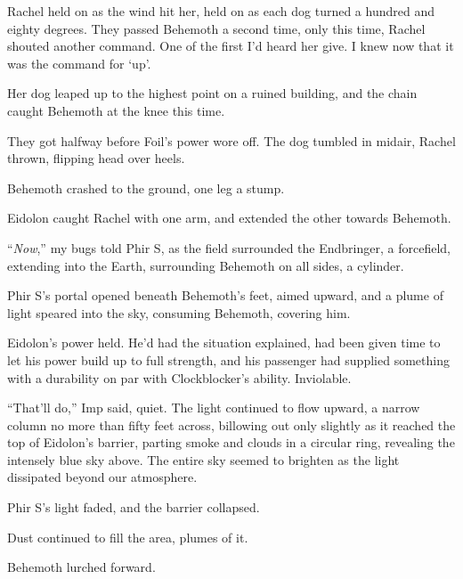 Rachel held on as the wind hit her, held on as each dog turned a hundred and eighty degrees.  They passed Behemoth a second time, only this time, Rachel shouted another command.  One of the first I'd heard her give.  I knew now that it was the command for `up'.



Her dog leaped up to the highest point on a ruined building, and the chain caught Behemoth at the knee this time.



They got halfway before Foil's power wore off.  The dog tumbled in midair, Rachel thrown, flipping head over heels.



Behemoth crashed to the ground, one leg a stump.



Eidolon caught Rachel with one arm, and extended the other towards Behemoth.



``\emph{Now},'' my bugs told Phir S, as the field surrounded the Endbringer, a forcefield, extending into the Earth, surrounding Behemoth on all sides, a cylinder.



Phir S's portal opened beneath Behemoth's feet, aimed upward, and a plume of light speared into the sky, consuming Behemoth, covering him.



Eidolon's power held.  He'd had the situation explained, had been given time to let his power build up to full strength, and his passenger had supplied something with a durability on par with Clockblocker's ability.  Inviolable.



``That'll do,'' Imp said, quiet.  The light continued to flow upward, a narrow column no more than fifty feet across, billowing out only slightly as it reached the top of Eidolon's barrier, parting smoke and clouds in a circular ring, revealing the intensely blue sky above.  The entire sky seemed to brighten as the light dissipated beyond our atmosphere.



Phir S's light faded, and the barrier collapsed.



Dust continued to fill the area, plumes of it.



Behemoth lurched forward.



